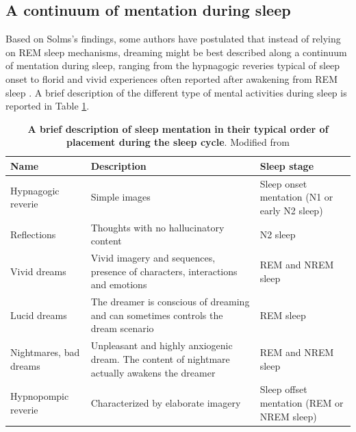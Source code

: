 \subsection{A continuum of mentation during sleep}
\label{sec:dream-research:link:continuum}

Based on Solms’s findings, some authors have postulated that instead of relying on REM sleep mechanisms, dreaming might be best described along a continuum of mentation during sleep, ranging from the hypnagogic reveries typical of sleep onset to florid and vivid experiences often reported after awakening from REM sleep \citep{schwartz_dreaming:_2005}. A brief description of the different type of mental activities during sleep is reported in Table \ref{tab:intro:continuum}.

\begin{table}[htb]
	\caption[A brief description of sleep mentation in their typical order of placement during the sleep cycle]{\textbf{A brief description of sleep mentation in their typical order of placement during the sleep cycle}. Modified from \citet{de_koninck_sleep_2012}}
	\label{tab:intro:continuum}
	\begin{tabularx}{\textwidth}{lXX}
	\toprule
	Name                  		   & Description                                                                          		   & Sleep stage                         			\\ \midrule
	Hypnagogic reverie             & Simple images                                                                                 & Sleep onset mentation (N1 or early N2 sleep) 	\\
	Reflections                    & Thoughts with no hallucinatory content                                                        & N2 sleep                                     	\\
	Vivid dreams                   & Vivid imagery and sequences, presence of characters, interactions and emotions                & REM and NREM sleep                           	\\
	Lucid dreams                   & The dreamer is conscious of dreaming and can sometimes controls the dream scenario            & REM sleep                                    	\\
	Nightmares, bad dreams 	   	   & Unpleasant and highly anxiogenic dream. The content of nightmare actually awakens the dreamer & REM and NREM sleep                             \\
	Hypnopompic reverie            & Characterized by elaborate imagery                                                            & Sleep offset mentation (REM or NREM sleep)   	\\ \bottomrule
	\end{tabularx}
\end{table}


